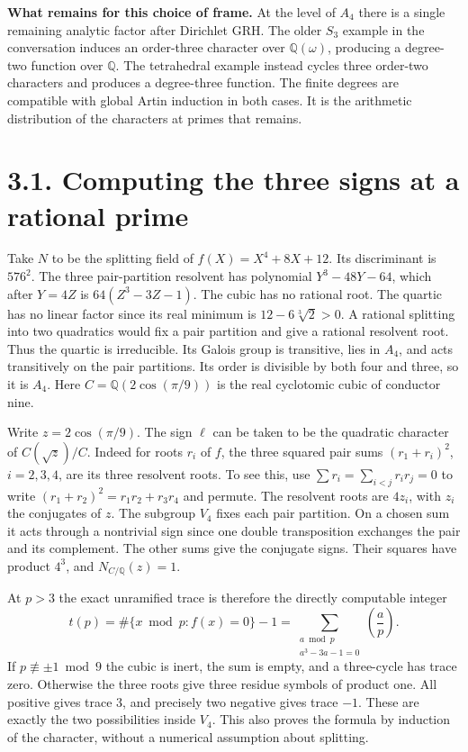 \documentclass[11pt,a4paper]{article}
\newcommand{\Q}{\mathbb Q}
\begin{document}
\textbf{What remains for this choice of frame.} At the level of $A_4$ there is a single remaining analytic
factor after Dirichlet GRH. The older $S_3$ example in the conversation induces an order-three character
over $\Q(\omega)$, producing a degree-two function over $\Q$. The tetrahedral example instead cycles three
order-two characters and produces a degree-three function. The finite degrees are compatible with global
Artin induction in both cases. It is the arithmetic distribution of the characters at primes that remains.

\newpage
\section*{3.1. Computing the three signs at a rational prime}
Take $N$ to be the splitting field of $f(X)=X^4+8X+12$.
Its discriminant is $576^2$. The three pair-partition resolvent has polynomial
$Y^3-48Y-64$, which after $Y=4Z$ is $64(Z^3-3Z-1)$. The cubic has no rational root.
The quartic has no linear factor since its real minimum is $12-6\sqrt[3]2>0$. A rational splitting into two
quadratics would fix a pair partition and give a rational resolvent root. Thus the quartic is irreducible.
Its Galois group is transitive, lies in $A_4$, and acts transitively on the pair partitions. Its order is divisible
by both four and three, so it is $A_4$. Here $C=\Q(2\cos(\pi/9))$ is the real cyclotomic cubic of conductor nine.

Write $z=2\cos(\pi/9)$. The sign $\ell$ can be taken to be the quadratic character of $C(\sqrt z)/C$.
Indeed for roots $r_i$ of $f$, the three squared pair sums $(r_1+r_i)^2$, $i=2,3,4$, are its three resolvent
roots. To see this, use $\sum r_i=\sum_{i<j}r_ir_j=0$ to write
$(r_1+r_2)^2=r_1r_2+r_3r_4$ and permute. The resolvent roots are $4z_i$, with $z_i$ the conjugates of $z$.
The subgroup $V_4$ fixes each pair partition. On a chosen sum it acts through a nontrivial sign since one
double transposition exchanges the pair and its complement. The other sums give the conjugate signs.
Their squares have product $4^3$, and $N_{C/\Q}(z)=1$.

At $p>3$ the exact unramified trace is therefore the directly computable integer
\[
 t(p)=\#\{x\bmod p:f(x)=0\}-1
     =\sum_{\substack{a\bmod p\\ a^3-3a-1=0}}\left(\frac ap\right).
\]
If $p\not\equiv\pm1\bmod9$ the cubic is inert, the sum is empty, and a three-cycle has trace zero.
Otherwise the three roots give three residue symbols of product one. All positive gives trace 3, and precisely
two negative gives trace $-1$. These are exactly the two possibilities inside $V_4$. This also proves the
formula by induction of the character, without a numerical assumption about splitting.
\end{document}
